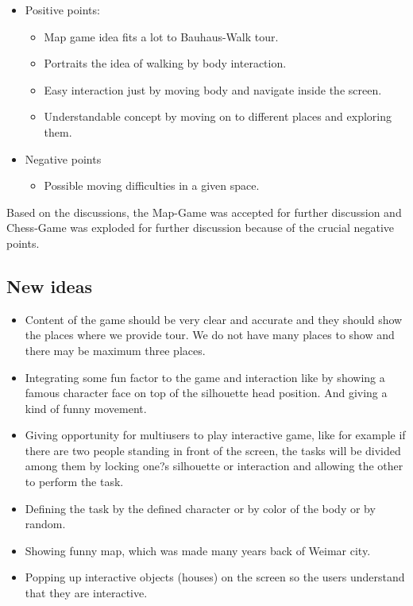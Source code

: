 \begin {itemize}

\item{Positive points:} 
\begin {itemize}

\item	Map game idea fits a lot to Bauhaus-Walk tour.
\item	Portraits the idea of walking by body interaction.
\item	Easy interaction just by moving body and navigate inside the screen.
\item	Understandable concept by moving on to different places and exploring them. 
\end {itemize}

\item{Negative points}
\begin {itemize}
\item	Possible moving difficulties in a given space.

\end {itemize}
\end {itemize}

Based on the discussions, the Map-Game was accepted for further discussion and Chess-Game was exploded for further discussion because of the crucial negative points.


\subsection{New ideas}
\begin {itemize}

\item	Content of the game should be very clear and accurate and they should show the places where we provide tour. We do not have many places to show and there may be maximum three places.
\item	Integrating some fun factor to the game and interaction like by showing a famous character face on top of the silhouette head position. And giving a kind of funny movement. 
\item	Giving opportunity for multiusers to play interactive game, like for example if there are two people standing in front of the screen, the tasks will be divided among them by locking one?s silhouette or interaction and allowing the other to perform the task.
\item	Defining the task by the defined character or by color of the body or by random. 
\item	Showing funny map, which was made many years back of Weimar city.
\item	Popping up interactive objects (houses) on the screen so the users understand that they are interactive. 

\end {itemize}


